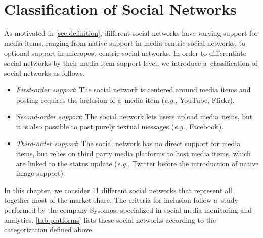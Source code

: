 {\section{Classification of Social Networks}
\label{sec:classification-of-social-networks}

As motivated in \autoref{sec:definition},
different social networks have varying support
for media items, ranging from native support
in media-centric social networks,
to optional support in micropost-centric social networks.
In order to differentiate social networks by their
media item support level,
we introduce a~classification of social networks as follows.

\begin{itemize}
  \item \emph{First-order support}:
        The social network is centered around media items
        and posting requires the inclusion of a~media item
        (\emph{e.g.}, YouTube, Flickr).
  \item \emph{Second-order support}:
        The social network lets users upload media items,
        but it is also possible to post purely textual messages
        (\emph{e.g.}, Facebook).
  \item \emph{Third-order support}:
        The social network has no direct support for media items,
        but relies on third party media platforms
        to host media items, which are linked to the status update
        (\emph{e.g.}, Twitter before the introduction of native
        image support).
\end{itemize}

In this chapter, we consider 11 different social networks
that represent all together most of the market share.
The criteria for inclusion follow
a~study~\cite{levine2011howpeopleshare}
performed by the company Sysomos, specialized in social media
monitoring and analytics.
\autoref{tab:platforms} lists these social networks according to the categorization defined above.

}
